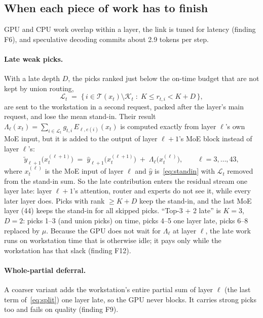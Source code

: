 \documentclass[11pt]{article}
\begin{document}
\subsection{When each piece of work has to finish}
\label{sec:when}
GPU and CPU work overlap within a layer, the link is tuned for latency (finding F6), and speculative decoding commits
about 2.9 tokens per step.

\paragraph{Late weak picks.} With a late depth $D$, the picks ranked just below the on-time budget that are not kept by
union routing,
\begin{equation}
  \mathcal{L}_t \;=\; \{\, i \in \mathcal{T}(x_t)\setminus\mathcal{K}_t \;:\; K \le r_{t,i} < K + D \,\},
  \label{eq:late-set}
\end{equation}
are sent to the workstation in a second request, packed after the layer's main request, and lose the mean stand-in.
Their result
$\Lambda_\ell(x_t) = \sum_{i\in\mathcal{L}_t} g_{t,i}\,E_{\ell,e(i)}(x_t)$ is computed exactly from layer $\ell$'s own MoE
input, but it is added to the output of layer $\ell+1$'s MoE block instead of layer $\ell$'s:
\begin{equation}
  \tilde y_{\ell+1}\big(x_{t}^{(\ell+1)}\big) \;=\; \hat y_{\ell+1}\big(x_{t}^{(\ell+1)}\big) \;+\; \Lambda_\ell\big(x_{t}^{(\ell)}\big),
  \qquad \ell = 3,\dots,43,
  \label{eq:late}
\end{equation}
where $x_t^{(\ell)}$ is the MoE input of layer $\ell$ and $\hat y$ is~\eqref{eq:standin} with $\mathcal{L}_t$ removed
from the stand-in sum. So the late contribution enters the residual stream one layer late: layer $\ell+1$'s attention,
router and experts do not see it, while every later layer does. Picks with rank $\ge K + D$ keep the stand-in, and the
last MoE layer (44) keeps the stand-in for all skipped picks. ``Top-3 + 2 late'' is $K = 3$, $D = 2$: picks 1--3 (and
union picks) on time, picks 4--5 one layer late, picks 6--8 replaced by $\mu$. Because the GPU does not wait for
$\Lambda_\ell$ at layer $\ell$, the late work runs on workstation time that is otherwise idle; it pays only while the
workstation has that slack (finding F12).

\paragraph{Whole-partial deferral.} A coarser variant adds the workstation's entire partial sum of layer $\ell$ (the last
term of~\eqref{eq:split}) one layer late, so the GPU never blocks. It carries strong picks too and fails on quality
(finding F9).
\end{document}
